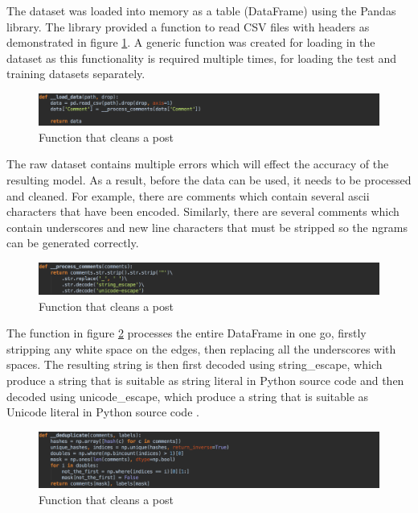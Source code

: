  The dataset was loaded into memory as a table (DataFrame) using the Pandas library. The library provided a function to read CSV files with headers as demonstrated in figure \ref{fig:AbuseDetection_LoadData}. A generic function was created for loading in the dataset as this functionality is required multiple times, for loading the test and training datasets separately.

\begin{figure}[H]
	\centering
	\includegraphics[width=\textwidth]{Images/Implementation/DataProcessing/AbuseDetection/LoadData}
	\caption{Function that cleans a post}
	\label{fig:AbuseDetection_LoadData}
\end{figure}

The raw dataset contains multiple errors which will effect the accuracy of the resulting model. As a result, before the data can be used, it needs to be processed and cleaned. For example, there are comments which contain several ascii characters that have been encoded. Similarly, there are several comments which contain underscores and new line characters that must be stripped so the ngrams can be generated correctly.

\begin{figure}[H]
	\centering
	\includegraphics[width=\textwidth]{Images/Implementation/DataProcessing/AbuseDetection/ProcessComments}
	\caption{Function that cleans a post}
	\label{fig:AbuseDetection-ProcessComments}
\end{figure}

The function in figure \ref{fig:AbuseDetection-ProcessComments} processes the entire DataFrame in one go, firstly stripping any white space on the edges, then replacing all the underscores with spaces. The resulting string is then first decoded using string\_escape, which produce a string that is suitable as string literal in Python source code and then decoded using unicode\_escape, which produce a string that is suitable as Unicode literal in Python source code \cite{Python:Codes}.

\begin{figure}[H]
	\centering
	\includegraphics[width=\textwidth]{Images/Implementation/DataProcessing/AbuseDetection/Deduplicate}
	\caption{Function that cleans a post}
	\label{fig:AbuseDetection-Deduplicate}
\end{figure}

